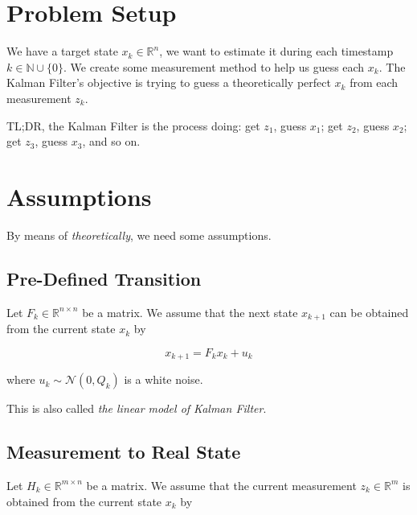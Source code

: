 \documentclass{article}
\begin{document}
    \section*{Problem Setup}

        We have a target state $ x_{k} \in \mathbb{R}^{n} $, we want to
        estimate it during each timestamp $ k \in \mathbb{N} \cup \{0\} $. We
        create some measurement method to help us guess each $ x_{k} $. The
        Kalman Filter's objective is trying to guess a theoretically perfect $
        x_{k} $ from each measurement $ z_{k} $.

        TL;DR, the Kalman Filter is
        the process doing: get $ z_{1} $, guess $ x_{1} $; get $ z_{2} $, guess
        $ x_{2} $; get $ z_{3} $, guess $ x_{3} $, and so on.

    \section{Assumptions}

        By means of \textit{theoretically}, we need some assumptions.

        \subsection{Pre-Defined Transition}

            Let $ F_{k} \in \mathbb{R}^{n \times n} $ be a matrix. We assume
            that the next state $ x_{k+1} $ can be obtained from the current
            state $ x_{k} $ by

            \begin{equation}
                 x_{k+1} = F_{k}x_{k} + u_{k}
            \end{equation}

            where $ u_{k} \sim \mathcal{N}(0, Q_{k}) $  is a white noise.

            This is also called \textit{the linear model of Kalman Filter}.

        \subsection{Measurement to Real State}

            Let $ H_{k} \in \mathbb{R}^{m \times n} $ be a matrix. We assume
            that the current measurement $ z_{k} \in \mathbb{R}^{m} $ is obtained from the current
            state $ x_{k} $ by
\end{document}
